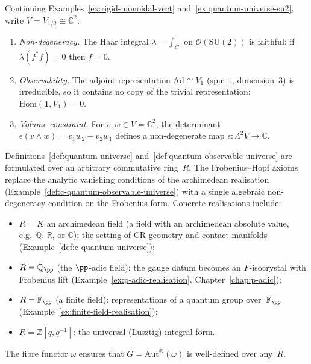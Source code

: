 \begin{example}
\label{ex:qou-su2}
Continuing Examples~\ref{ex:rigid-monoidal-vect}
and~\ref{ex:quantum-universe-su2}, write
$V = V_{1/2} \cong \mathbb{C}^2$:
\begin{enumerate}
  \item \emph{Non-degeneracy.}  The Haar integral $\lambda = \int_G$ on
        $\mathcal{O}(\mathrm{SU}(2))$ is faithful: if
        $\lambda(f^* f) = 0$ then $f = 0$.
  \item \emph{Observability.}  The adjoint representation
        $\mathrm{Ad} \cong V_1$ (spin-$1$, dimension~$3$)
        is irreducible, so it contains no copy of the
        trivial representation: $\mathrm{Hom}(\mathbf{1}, V_1) = 0$.
  \item \emph{Volume constraint.}  For $v, w \in V = \mathbb{C}^2$,
        the determinant
        $\epsilon(v \wedge w) = v_1 w_2 - v_2 w_1$
        defines a non-degenerate map
        $\epsilon \colon \Lambda^2 V \to \mathbb{C}$.
\end{enumerate}
\end{example}

\begin{remark}
\label{rem:base-field-independence}
Definitions~\ref{def:quantum-universe} and~\ref{def:quantum-observable-universe}
are formulated over an arbitrary commutative ring~$R$.  The Frobenius--Hopf axioms
replace the analytic vanishing conditions of the archimedean realisation
(Example~\ref{def:c-quantum-observable-universe}) with a single algebraic
non-degeneracy condition on the Frobenius form.  Concrete realisations
include:
\begin{itemize}
  \item $R = K$ an archimedean field (a field with an archimedean absolute
        value, e.g.\ $\mathbb{Q}$, $\mathbb{R}$, or $\mathbb{C}$): the
        setting of CR geometry and contact manifolds
        (Example~\ref{def:c-quantum-universe});
  \item $R = \mathbb{Q}_\pp$ (the $\pp$-adic field): the gauge datum becomes
        an $F$-isocrystal with Frobenius lift
        (Example~\ref{ex:p-adic-realisation},
        Chapter~\ref{chap:p-adic});
  \item $R = \mathbb{F}_\pp$ (a finite field): representations of a quantum
        group over~$\mathbb{F}_\pp$
        (Example~\ref{ex:finite-field-realisation});
  \item $R = \mathbb{Z}[q, q^{-1}]$: the universal (Lusztig) integral form.
\end{itemize}
The fibre functor $\omega$ ensures that $G = \mathrm{Aut}^{\otimes}(\omega)$
is well-defined over any~$R$.
\end{remark}

